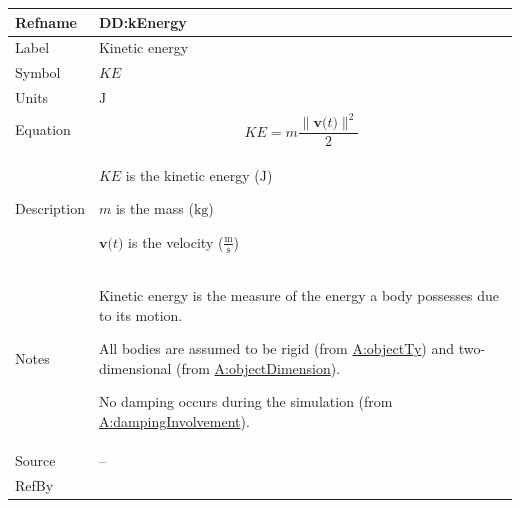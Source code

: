 \documentclass[12pt]{article}
\begin{document}
\medskip
\noindent
\begin{minipage}{\textwidth}
\begin{tabular}{>{\raggedright}p{}>{\raggedright\arraybackslash}p{}}
\toprule \textbf{Refname} & \textbf{DD:kEnergy}
\label{DD:kEnergy}
\\ \midrule
Label & Kinetic energy
        
\\ \midrule
Symbol & $KE$
         
\\ \midrule
Units & ${\text{J}}$
        
\\ \midrule
Equation & \begin{displaymath}
           KE=m \frac{\|\symbf{v}\text{(}t\text{)}\|^{2}}{2}
           \end{displaymath}
\\ \midrule
Description & \begin{symbDescription}
              \item{$KE$ is the kinetic energy (${\text{J}}$)}
              \item{$m$ is the mass (${\text{kg}}$)}
              \item{$\symbf{v}\text{(}t\text{)}$ is the velocity ($\frac{\text{m}}{\text{s}}$)}
              \end{symbDescription}
\\ \midrule
Notes & Kinetic energy is the measure of the energy a body possesses due to its motion.
        
        All bodies are assumed to be rigid (from \hyperref[assumpOT]{A:objectTy}) and two-dimensional (from \hyperref[assumpOD]{A:objectDimension}).
        
        No damping occurs during the simulation (from \hyperref[assumpDI]{A:dampingInvolvement}).
        
\\ \midrule
Source & --
         
\\ \midrule
RefBy & 
\\ \bottomrule
\end{tabular}
\end{minipage}
\end{document}
